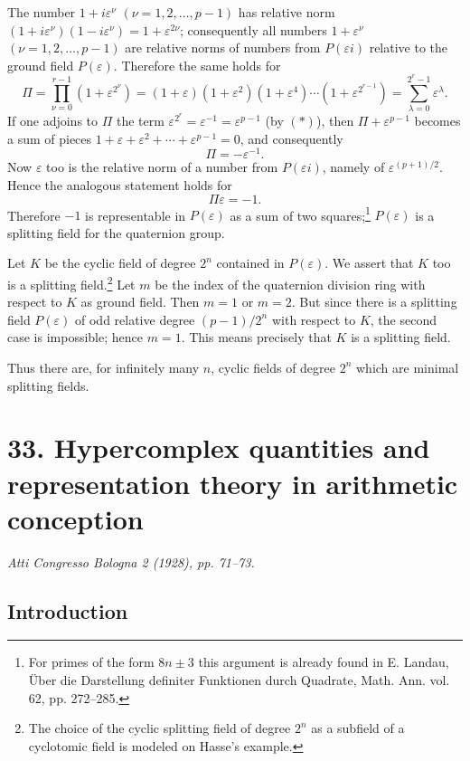 \documentclass[11pt]{article}
\begin{document}
The number $1+i\varepsilon^\nu$ $(\nu=1,2,\ldots,p-1)$ has relative norm $(1+i\varepsilon^\nu)(1-i\varepsilon^\nu)=1+\varepsilon^{2\nu}$; consequently all numbers $1+\varepsilon^\nu$ $(\nu=1,2,\ldots,p-1)$ are relative norms of numbers from $P(\varepsilon i)$ relative to the ground field $P(\varepsilon)$. Therefore the same holds for
\[
\Pi=\prod_{\nu=0}^{r-1}(1+\varepsilon^{2^\nu})
=(1+\varepsilon)(1+\varepsilon^2)(1+\varepsilon^4)\cdots(1+\varepsilon^{2^{r-1}})
=\sum_{\lambda=0}^{2^r-1}\varepsilon^\lambda.
\]
If one adjoins to $\Pi$ the term $\varepsilon^{2^r}=\varepsilon^{-1}=\varepsilon^{p-1}$ (by $(*)$), then $\Pi+\varepsilon^{p-1}$ becomes a sum of pieces $1+\varepsilon+\varepsilon^2+\cdots+\varepsilon^{p-1}=0$, and consequently
\[
        \Pi=-\varepsilon^{-1}.
\]
Now $\varepsilon$ too is the relative norm of a number from $P(\varepsilon i)$, namely of $\varepsilon^{(p+1)/2}$. Hence the analogous statement holds for
\[
        \Pi\varepsilon=-1.
\]
Therefore $-1$ is representable in $P(\varepsilon)$ as a sum of two squares;\footnote{For primes of the form $8n\pm3$ this argument is already found in E. Landau, Über die Darstellung definiter Funktionen durch Quadrate, Math. Ann. vol. 62, pp. 272--285.} $P(\varepsilon)$ is a splitting field for the quaternion group.

Let $K$ be the cyclic field of degree $2^n$ contained in $P(\varepsilon)$. We assert that $K$ too is a splitting field.\footnote{The choice of the cyclic splitting field of degree $2^n$ as a subfield of a cyclotomic field is modeled on Hasse's example.} Let $m$ be the index of the quaternion division ring with respect to $K$ as ground field. Then $m=1$ or $m=2$. But since there is a splitting field $P(\varepsilon)$ of odd relative degree $(p-1)/2^n$ with respect to $K$, the second case is impossible; hence $m=1$. This means precisely that $K$ is a splitting field.

Thus there are, for infinitely many $n$, cyclic fields of degree $2^n$ which are minimal splitting fields.

\section*{33. Hypercomplex quantities and representation theory in arithmetic conception}
\emph{Atti Congresso Bologna 2 (1928), pp. 71--73.}

\subsection*{Introduction}
\end{document}
